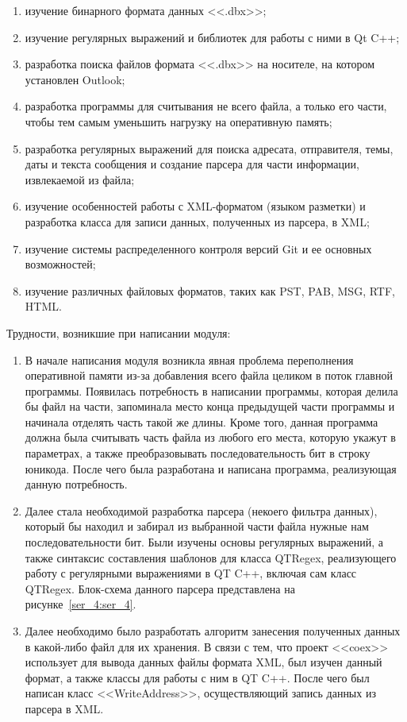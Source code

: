 \begin{enumerate}
  \item изучение бинарного формата данных <<.dbx>>;
  \item изучение регулярных выражений и библиотек для работы с ними в Qt C++;
  \item разработка поиска файлов формата <<.dbx>> на носителе, на котором установлен Outlook;
  \item разработка программы для считывания не всего файла, а только его части, чтобы тем самым 
  уменьшить нагрузку на оперативную память;
  \item разработка регулярных выражений для поиска адресата, отправителя, темы, даты и 
  текста сообщения и создание парсера для части информации, извлекаемой из файла;
  \item изучение особенностей работы с XML-форматом (языком разметки) и разработка класса для 
  записи данных, полученных из парсера, в XML;
  \item изучение системы распределенного контроля версий Git и ее основных возможностей;
  \item изучение различных файловых форматов, таких как PST, PAB, MSG, RTF, HTML.  
\end{enumerate}

Трудности, возникшие при написании модуля:

\begin{enumerate}
  \item В начале написания модуля  возникла явная проблема переполнения оперативной 
  памяти из-за добавления всего файла целиком в поток главной программы. 
  Появилась потребность в написании программы, которая делила бы файл на части, 
  запоминала место конца предыдущей части программы и начинала отделять часть 
  такой же длины. Кроме того, данная программа должна была считывать часть файла из любого его места, 
  которую укажут в параметрах, а также преобразовывать последовательность бит в строку юникода. 
  После чего была разработана и написана программа, реализующая данную потребность.
  \item Далее стала необходимой разработка парсера (некоего фильтра данных), который бы находил и 
  забирал из выбранной части файла нужные нам последовательности бит. Были изучены основы регулярных 
  выражений, а также синтаксис составления шаблонов для класса QTRegex, реализующего работу с  
  регулярными выражениями в QT C++, включая сам класс QTRegex. Блок-схема данного парсера представлена 
  на рисунке~\ref{ser_4:ser_4}.
  \item Далее необходимо было разработать алгоритм занесения полученных данных в какой-либо 
  файл для их хранения. В связи с тем, что проект <<coex>> использует для вывода данных 
  файлы формата XML, был изучен данный формат, а также классы для работы с ним в QT C++. 
  После чего был написан класс <<WriteAddress>>, осуществляющий запись данных из парсера в XML. 
\end{enumerate}

